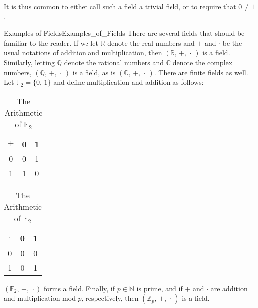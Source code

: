     It is thus common to either call such a field a trivial field, or
    to require that $0\ne{1}$.
    \begin{lexample}{Examples of Fields}{Examples_of_Fields}
        There are several fields that should be familiar to the reader.
        If we let $\mathbb{R}$ denote the real numbers and $+$ and $\cdot$
        be the usual notations of addition and multiplication, then
        $(\mathbb{R},\,+,\,\cdot\,)$ is a field. Similarly, letting
        $\mathbb{Q}$ denote the rational numbers and $\mathbb{C}$ denote
        the complex numbers, $(\mathbb{Q},\,+,\,\cdot\,)$ is a field, as
        is $(\mathbb{C},\,+,\,\cdot\,)$. There are finite fields as well.
        Let $\mathbb{F}_{2}=\{0,\,1\}$ and define multiplication and
        addition as follows:
        \par\hfill\par
        \begin{table}[H]
            \centering
            \captionsetup{type=table}
            \parbox{.45\linewidth}{%
                \centering
                \begin{tabular}{c|cc}
                    $+$&0&1\\
                    \hline
                    0&0&1\\
                    1&1&0
                \end{tabular}
            }
            \parbox{.45\linewidth}{%
                \centering
                \begin{tabular}{c|cc}
                    $\cdot$&0&1\\
                    \hline
                    0&0&0\\
                    1&0&1
                \end{tabular}
            }
            \caption{The Arithmetic of $\mathbb{F}_{2}$}
        \end{table}
        $(\mathbb{F}_{2},\,+,\,\cdot)$ forms a field. Finally, if
        $p\in\mathbb{N}$ is prime, and if $+$ and $\cdot$ are addition
        and multiplication mod $p$, respectively, then
        $(\mathbb{Z}_{p},\,+,\,\cdot\,)$ is a field.
    \end{lexample}
